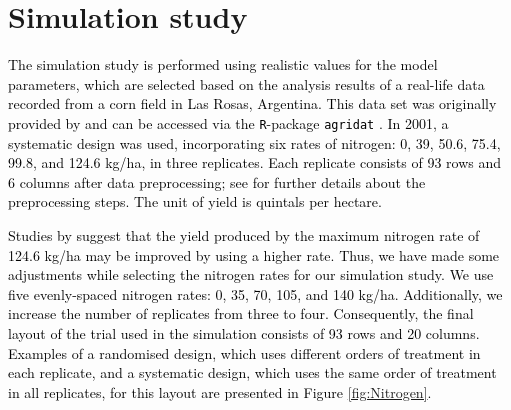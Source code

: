 \documentclass[a4paper]{article} 	%
\newcommand{\revision}[1]{\textcolor{black}{#1}}
\newcommand{\zc}[1]{\textcolor{black}{#1}}
\begin{document}



\section{Simulation study}\label{Sec:Simu}



\revision{The simulation study is performed using realistic values for the model parameters, which are selected based on the analysis results of a real-life data recorded from a corn field in Las Rosas, Argentina. This data set was originally provided by \textcite{Luc2004ASpatial} and can be accessed via the \texttt{R}-package \texttt{agridat} \parencite{White2008Agridat}. In 2001, a systematic design was used, incorporating six rates of nitrogen: 0, 39, 50.6, 75.4, 99.8, and 124.6 kg/ha, in three replicates. Each replicate consists of 93 rows and 6 columns after data preprocessing; see \textcite{Rakshit2020Novel} for further details about the preprocessing steps. The unit of yield is quintals per hectare.} 

\revision{Studies by \textcite{Rakshit2020Novel, Cao2022Bayesian} suggest that the yield produced by the maximum nitrogen rate of 124.6 kg/ha may be improved by using a higher rate. Thus, we have made some adjustments while selecting the nitrogen rates for our simulation study. We use five evenly-spaced nitrogen rates: 0, 35, 70, 105, and 140 kg/ha. Additionally, we increase the number of replicates from three to four. Consequently, the final layout of the trial used in the simulation consists of 93 rows and 20 columns. Examples of a randomised design, \zc{which uses different orders of treatment in each replicate}, and a systematic design, \zc{which uses the same order of treatment in all replicates}, for this layout are presented in Figure \ref{fig:Nitrogen}.} 
\end{document}
